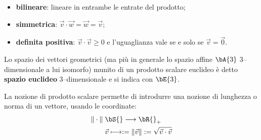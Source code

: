 \begin{itemize}
  \item {\bf bilineare}: lineare in entrambe le entrate del prodotto; 
  \item {\bf simmetrica}: $\vec v\cdot \vec w = \vec w = \vec v$;
  \item {\bf definita positiva}: $\vec v\cdot \vec v \ge 0$ e l'uguaglianza vale 
se e solo se 
            $\vec v = \vec 0$.
\end{itemize}
Lo spazio dei vettori geometrici (ma pi\`u in generale lo spazio affine $\bA{3}$ 
3--dimensionale 
a lui isomorfo) munito di un prodotto scalare euclideo \`e detto {\bf spazio 
euclideo} 
3--dimensionale e si indica con $\bE{3}$.

La nozione di prodotto scalare permette di introdurre una nozione di lunghezza o 
norma 
di un vettore, usando le coordinate:
\[\begin{aligned}
  \|\cdot \| &\; \bS{} \longrightarrow \bR{}_+\\
  &\; \vec v \longmapsto := \|\vec v\| := \sqrt{\vec v\cdot \vec v}
\end{aligned}\]

